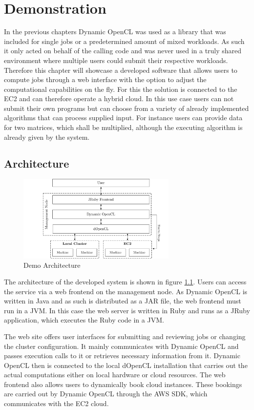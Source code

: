 \chapter{Demonstration}

In the previous chapters Dynamic OpenCL was used as a library that was included for single jobs or a predetermined amount of mixed workloads. As such it only acted on behalf of the calling code and was never used in a truly shared environment where multiple users could submit their respective workloads. Therefore this chapter will showcase a developed software that allows users to compute jobs through a web interface with the option to adjust the computational capabilities on the fly. For this the solution is connected to the EC2 and can therefore operate a hybrid cloud. In this use case users can not submit their own programs but can choose from a variety of already implemented algorithms that can process supplied input. For instance users can provide data for two matrices, which shall be multiplied, although the executing algorithm is already given by the system.

\section{Architecture}

\begin{figure}[!htb]
	\includegraphics[width=0.7\textwidth]{drawings/demo_architecture.pdf}
	\centering
	\caption{Demo Architecture}
	\label{img:demo_architecture}
\end{figure}
The architecture of the developed system is shown in figure \ref{img:demo_architecture}. Users can access the service via a web frontend on the management node. As Dynamic OpenCL is written in Java and as such is distributed as a JAR file, the web frontend must run in a JVM. In this case the web server is written in Ruby and runs as a JRuby application, which executes the Ruby code in a JVM. 

The web site offers user interfaces for submitting and reviewing jobs or changing the cluster configuration. It mainly communicates with Dynamic OpenCL and passes execution calls to it or retrieves necessary information from it. Dynamic OpenCL then is connected to the local dOpenCL installation that carries out the actual computations either on local hardware or cloud resources. The web frontend also allows users to dynamically book cloud instances. These bookings are carried out by Dynamic OpenCL through the AWS SDK, which communicates with the EC2 cloud.
